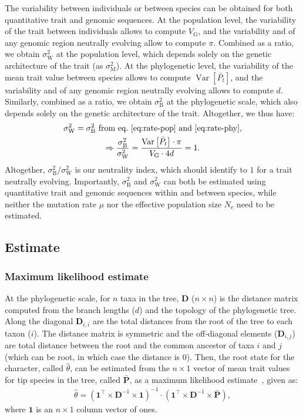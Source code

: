 \documentclass{article}
\newcommand{\Multiply}{\cdot}
\newcommand{\MultiplyMatrix}{\times}
\newcommand{\UniDimArray}[1]{\bm{#1}}
\newcommand{\BiDimArray}[1]{\bm{#1}}
\newcommand{\tr}{^{\intercal}}
\newcommand{\inv}{^{-1}}
\DeclareMathOperator{\Var}{\text{Var}}
\newcommand{\Ne}{N_{\text{e}}}
\newcommand{\Spi}{i}
\newcommand{\Spj}{j}
\newcommand{\NbrTaxa}{n}
\newcommand{\Time}{t}
\newcommand{\Trait}{P}
\newcommand{\MeanTrait}{\bar{\Trait_{\Time}}}
\newcommand{\VecTrait}{\UniDimArray{\bar{\Trait}}}
\newcommand{\RootTrait}{\widehat{\theta}}
\newcommand{\VarPhy}{\Var \left[\MeanTrait\right]}
\newcommand{\VecOne}{\UniDimArray{1}}
\newcommand{\Distance}{\BiDimArray{D}}
\newcommand{\DistanceMatrix}{\BiDimArray{\Distance}}
\newcommand{\MutationRate}{\mu}
\newcommand{\VarGenetic}{V_{\mathrm{G}}}
\newcommand{\RateMut}{\sigma^2_{\mathrm{M}}}
\newcommand{\RatePhy}{\sigma^2_{\mathrm{B}}}
\newcommand{\RatePop}{\sigma^2_{\mathrm{W}}}
\begin{document}
 The variability between individuals or between species can be obtained for both quantitative trait and genomic sequences.
 At the population level, the variability of the trait between individuals allows to compute $\VarGenetic$, and the variability and of any genomic region neutrally evolving allow to compute $\pi$.
Combined as a ratio, we obtain $\RatePop$ at the population level, which depends solely on the genetic architecture of the trait (as $\RateMut$).
At the phylogenetic level, the variability of the mean trait value between species allows to compute $\VarPhy$, and the variability and of any genomic region neutrally evolving allows to compute $d$.
Similarly, combined as a ratio, we obtain $\RatePhy$ at the phylogenetic scale, which also depends solely on the genetic architecture of the trait.
Altogether, we thus have:
\begin{gather}
    \RatePop = \RatePhy \text{ from eq.~\ref{eq:rate-pop} and~\ref{eq:rate-phy}} , \\
    \Rightarrow \frac{\RatePhy}{\RatePop} = \frac{\VarPhy \Multiply \pi}{ \VarGenetic \Multiply 4 d }  = 1.
\end{gather}
Altogether, $\RatePhy / \RatePop$ is our neutrality index, which should identify to $1$ for a trait neutrally evolving.
Importantly, $\RatePhy$ and $\RatePop$ can both be estimated using quantitative trait and genomic sequences within and between species, while neither the mutation rate $\MutationRate$ nor the effective population size $\Ne$ need to be estimated.

\subsection*{Estimate}\label{subsec:estimate}

\subsubsection*{Maximum likelihood estimate}
At the phylogenetic scale, for $\NbrTaxa$ taxa in the tree, $\DistanceMatrix$ ($\NbrTaxa \times \NbrTaxa$) is the distance matrix computed from the branch lengths ($d$) and the topology of the phylogenetic tree.
Along the diagonal $\Distance_{\Spi,\Spi}$ are the total distances from the root of the tree to each taxon ($\Spi$).
The distance matrix is symmetric and the off-diagonal elements ($\Distance_{\Spi,\Spj}$) are total distance between the root and the common ancestor of taxa $\Spi$ and $\Spj$ (which can be root, in which case the distance is 0).
Then, the root state for the character, called $\RootTrait$, can be estimated from the $\NbrTaxa \times 1$ vector of mean trait values for tip species in the tree, called $\VecTrait$, as a maximum likelihood estimate~\cite{omeara_testing_2006}, given as:
\begin{gather}
    \RootTrait = \left( \VecOne\tr \MultiplyMatrix \DistanceMatrix\inv \MultiplyMatrix \VecOne \right)\inv \Multiply \left( \VecOne\tr \MultiplyMatrix \DistanceMatrix\inv \MultiplyMatrix \VecTrait \right), \label{eq:estimated-root-trait}
\end{gather}
where $\VecOne$ is an $\NbrTaxa \times 1$ column vector of ones.
\end{document}
